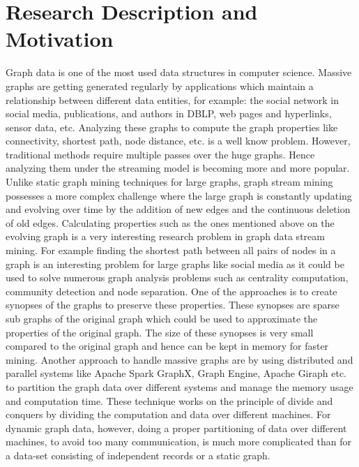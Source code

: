 

\section*{Research Description and Motivation}
Graph data is one of the most used data structures in computer science. Massive graphs are getting generated regularly by applications which maintain a relationship between different data entities, for example: the social network in social media, publications, and authors in DBLP, web pages and hyperlinks, sensor data, etc. Analyzing these graphs to compute the graph properties like connectivity, shortest path, node distance, etc. is a well know problem. However, traditional methods require multiple passes over the huge graphs. Hence analyzing them under the streaming model is becoming more and more popular. Unlike static graph mining techniques for large graphs, graph stream mining possesses a more complex challenge where the large graph is constantly updating and evolving over time by the addition of new edges and the continuous deletion of old edges. Calculating properties such as the ones mentioned above on the evolving graph is a very interesting research problem in graph data stream mining. For example finding the shortest path between all pairs of nodes in a graph is an interesting problem for large graphs like social media as it could be used to solve numerous graph analysis problems such as centrality computation, community detection and node separation. One of the approaches is to create synopses of the graphs to preserve these properties. These synopses are sparse sub graphs of the original graph which could be used to approximate the properties of the original graph. The size of these synopses is very small compared to the original graph and hence can be kept in memory for faster mining. Another approach to handle massive graphs are by using  distributed and parallel systems like Apache Spark GraphX, Graph Engine, Apache Giraph etc. to partition the graph data over different systems and manage the memory usage and computation time. These technique works on the principle of divide and conquers by dividing the computation and data over different machines. For dynamic graph data, however, doing a proper partitioning of data over different machines, to avoid too many communication, is much more complicated than for a data-set consisting of independent records or a static graph.

